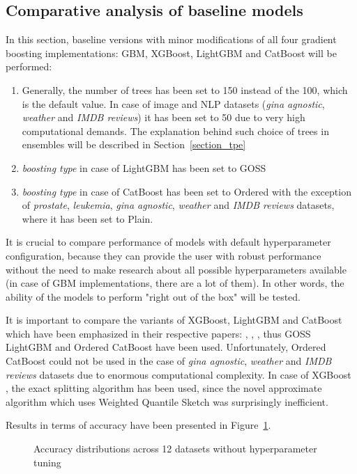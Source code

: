 \documentclass[magisterska, english]{pwr_wmat_praca_dyplomowa}
\theoremstyle{plain}
\numberwithin{theorem}{chapter}
\theoremstyle{definition}
\numberwithin{theorem}{chapter}
\begin{document}
\subsection{Comparative analysis of baseline models}\label{section:baseline}
In this section, baseline versions with minor modifications of all four gradient boosting implementations: GBM, XGBoost, LightGBM and CatBoost will be performed:
\begin{enumerate}
    \item Generally, the number of trees has been set to 150 instead of the 100, which is the default value. In case of image and NLP datasets (\emph{gina agnostic}, \emph{weather} and \emph{IMDB reviews}) it has been set to 50 due to very high computational demands. The explanation behind such choice of trees in ensembles will be described in Section~\ref{section_tpe}
    \item \emph{boosting type} in case of LightGBM has been set to GOSS
    \item \emph{boosting type} in case of CatBoost has been set to Ordered with the exception of \emph{prostate}, \emph{leukemia}, \emph{gina agnostic}, \emph{weather} and \emph{IMDB reviews} datasets, where it has been set to Plain.
\end{enumerate}

It is crucial to compare performance of models with default hyperparameter configuration, because they can provide the user with robust performance without the need to make research about all possible hyperparameters available (in case of GBM implementations, there are a lot of them). In other words, the ability of the models to perform "right out of the box" will be tested.

It is important to compare the variants of XGBoost, LightGBM and CatBoost which have been emphasized in their respective papers: \cite{xgboost}, \cite{lightgbm}, \cite{catboost}, thus GOSS LightGBM and Ordered CatBoost have been used. Unfortunately, Ordered CatBoost could not be used in the case of \emph{gina agnostic}, \emph{weather} and \emph{IMDB reviews} datasets due to enormous computational complexity. In case of XGBoost \cite{xgboost}, the exact splitting algorithm has been used, since the novel approximate algorithm which uses Weighted Quantile Sketch was surprisingly inefficient.

Results in terms of accuracy have been presented in Figure~\ref{fig:no_tuning_accuracy}.

\begin{figure}[H]
	\centering
	\caption{Accuracy distributions across 12 datasets without hyperparameter tuning}
	\label{fig:no_tuning_accuracy}
\end{figure}
\end{document}
